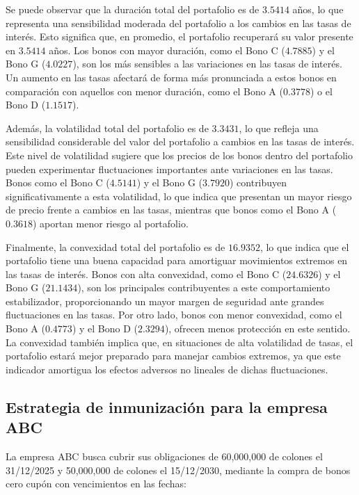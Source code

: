 \documentclass[12pt]{article}
\begin{document}
Se puede observar que la duración total del portafolio es de \(3.5414\) años, lo que representa una sensibilidad moderada del portafolio a los cambios en las tasas de interés. Esto significa que, en promedio, el portafolio recuperará su valor presente en \(3.5414\) años. Los bonos con mayor duración, como el Bono C (\(4.7885\)) y el Bono G (\(4.0227\)), son los más sensibles a las variaciones en las tasas de interés. Un aumento en las tasas afectará de forma más pronunciada a estos bonos en comparación con aquellos con menor duración, como el Bono A (\(0.3778\)) o el Bono D (\(1.1517\)).

Además, la volatilidad total del portafolio es de \(3.3431\), lo que refleja una sensibilidad considerable del valor del portafolio a cambios en las tasas de interés. Este nivel de volatilidad sugiere que los precios de los bonos dentro del portafolio pueden experimentar fluctuaciones importantes ante variaciones en las tasas. Bonos como el Bono C (\(4.5141\)) y el Bono G (\(3.7920\)) contribuyen significativamente a esta volatilidad, lo que indica que presentan un mayor riesgo de precio frente a cambios en las tasas, mientras que bonos como el Bono A (\(0.3618\)) aportan menor riesgo al portafolio.

Finalmente, la convexidad total del portafolio es de \(16.9352\), lo que indica que el portafolio tiene una buena capacidad para amortiguar movimientos extremos en las tasas de interés. Bonos con alta convexidad, como el Bono C (\(24.6326\)) y el Bono G (\(21.1434\)), son los principales contribuyentes a este comportamiento estabilizador, proporcionando un mayor margen de seguridad ante grandes fluctuaciones en las tasas. Por otro lado, bonos con menor convexidad, como el Bono A (\(0.4773\)) y el Bono D (\(2.3294\)), ofrecen menos protección en este sentido. La convexidad también implica que, en situaciones de alta volatilidad de tasas, el portafolio estará mejor preparado para manejar cambios extremos, ya que este indicador amortigua los efectos adversos no lineales de dichas fluctuaciones.

\subsection{Estrategia de inmunización para la empresa ABC}

La empresa ABC busca cubrir sus obligaciones de 60,000,000 de colones el 31/12/2025 y 50,000,000 de colones el 15/12/2030, mediante la compra de bonos cero cupón con vencimientos en las fechas:  
\end{document}
